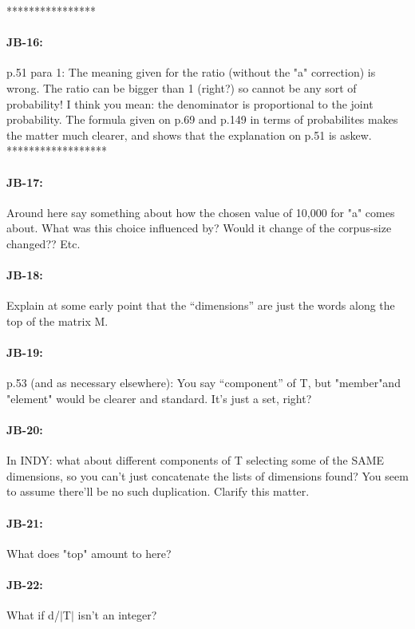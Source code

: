 \documentclass[11pt,a4paper]{article}
\begin{document}
****************
\paragraph{JB-16:} p.51 para 1: The meaning given for the ratio (without the "a" correction) is wrong. The ratio can be bigger than 1 (right?) so cannot be any sort of probability! I think you mean: the denominator is proportional to the joint probability. The formula given on p.69 and p.149 in terms of probabilites makes the matter much clearer, and shows that the explanation on p.51 is askew.
******************

\paragraph{JB-17:} Around here say something about how the chosen value of 10,000 for "a" comes about. What was this choice influenced by? Would it change of the corpus-size changed?? Etc.

\paragraph{JB-18:} Explain at some early point that the ``dimensions'' are just the words along the top of the matrix M.

\paragraph{JB-19:} p.53 (and as necessary elsewhere): You say ``component'' of T, but "member"and "element" would be clearer and standard. It's just a set, right?

\paragraph{JB-20:} In INDY: what about different components of T selecting some of the SAME dimensions, so you can't just concatenate the lists of dimensions found? You seem to assume there'll be no such duplication. Clarify this matter.

\paragraph{JB-21:} What does "top" amount to here?

\paragraph{JB-22:} What if d/$|$T$|$ isn't an integer?
\end{document}
